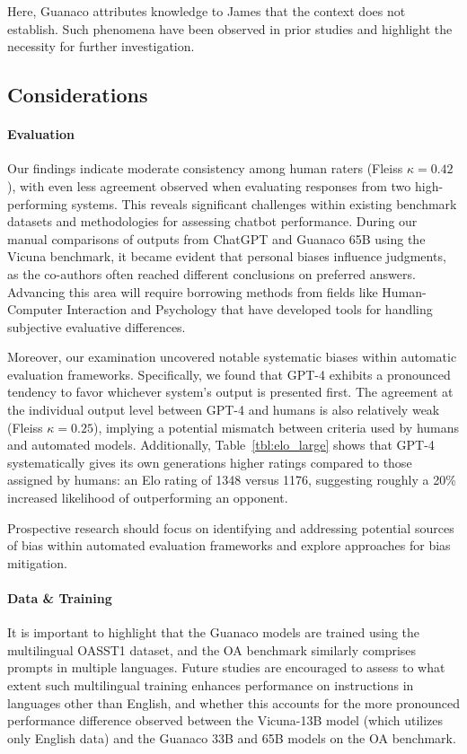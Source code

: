 Here, {Guanaco} attributes knowledge to James that the context does not establish. Such phenomena have been observed in prior studies \cite{sap2022neural} and highlight the necessity for further investigation.

\subsection{Considerations}
\label{ssec:considerations}

\paragraph{Evaluation}

Our findings indicate moderate consistency among human raters (Fleiss $\kappa=0.42$), with even less agreement observed when evaluating responses from two high-performing systems. This reveals significant challenges within existing benchmark datasets and methodologies for assessing chatbot performance. During our manual comparisons of outputs from ChatGPT and {Guanaco} 65B using the Vicuna benchmark, it became evident that personal biases influence judgments, as the co-authors often reached different conclusions on preferred answers. Advancing this area will require borrowing methods from fields like Human-Computer Interaction and Psychology that have developed tools for handling subjective evaluative differences.

Moreover, our examination uncovered notable systematic biases within automatic evaluation frameworks. Specifically, we found that GPT-4 exhibits a pronounced tendency to favor whichever system's output is presented first. The agreement at the individual output level between GPT-4 and humans is also relatively weak (Fleiss $\kappa=0.25$), implying a potential mismatch between criteria used by humans and automated models. Additionally, Table~\ref{tbl:elo_large} shows that GPT-4 systematically gives its own generations higher ratings compared to those assigned by humans: an Elo rating of 1348 versus 1176, suggesting roughly a 20\% increased likelihood of outperforming an opponent.

Prospective research should focus on identifying and addressing potential sources of bias within automated evaluation frameworks and explore approaches for bias mitigation.

\paragraph{Data \& Training} It is important to highlight that the {Guanaco} models are trained using the multilingual OASST1 dataset, and the OA benchmark similarly comprises prompts in multiple languages. Future studies are encouraged to assess to what extent such multilingual training enhances performance on instructions in languages other than English, and whether this accounts for the more pronounced performance difference observed between the Vicuna-13B model (which utilizes only English data) and the {Guanaco} 33B and 65B models on the OA benchmark.

